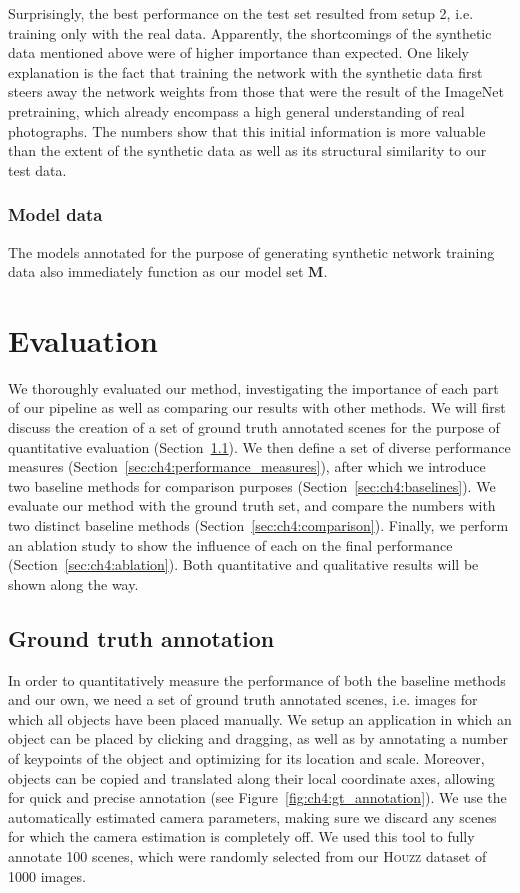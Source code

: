 \documentclass[10pt,twocolumn,letterpaper]{article}
\newcommand{\bb}[1]{{\bm{#1}}}
\begin{document}
Surprisingly, the best performance on the test set resulted from setup 2, i.e.
training only with the real data. Apparently, the shortcomings of the synthetic
data mentioned above were of higher importance than expected. One likely
explanation is the fact that training the network with the synthetic data first
steers away the network weights from those that were the result of the ImageNet
pretraining, which already encompass a high general understanding of real
photographs. The numbers show that this initial information is more valuable than the
extent of the synthetic data as well as its structural similarity to our test
data.

\subsubsection{Model data} The models annotated for the purpose of generating
synthetic network training data also immediately function as our model set
$\bb{M}$.

\section{Evaluation}
\label{sec:ch4:evaluation}
We thoroughly evaluated our method, investigating the importance of each part
of our pipeline as well as comparing our results with other methods.  We will
first discuss the creation of a set of ground truth annotated scenes for the
purpose of quantitative evaluation (Section~\ref{sec:ch4:ground_truth_annotation}). We then define
a set of diverse performance measures (Section~\ref{sec:ch4:performance_measures}), after which we introduce two baseline methods for comparison purposes (Section~\ref{sec:ch4:baselines}). We evaluate our method with the ground truth set,
and compare the numbers with two distinct baseline methods (Section~\ref{sec:ch4:comparison}). Finally, we perform
an ablation study to show the influence of each on the final performance (Section~\ref{sec:ch4:ablation}). Both
quantitative and qualitative results will be shown along the way.

\subsection{Ground truth annotation}
\label{sec:ch4:ground_truth_annotation}
In order to quantitatively measure the performance of both the baseline methods
and our own, we need a set of ground truth annotated scenes, i.e. images for
which all objects have been placed manually.  We setup an application in which
an object can be placed by clicking and dragging, as well as by annotating a
number of keypoints of the object and optimizing for its location and scale.
Moreover, objects can be copied and translated along their local coordinate
axes, allowing for quick and precise annotation (see
Figure~\ref{fig:ch4:gt_annotation}). We use the automatically estimated camera
parameters, making sure we discard any scenes for which the camera estimation
is completely off.  We used this tool to fully annotate 100 scenes, which were
randomly selected from our \textsc{Houzz} dataset of 1000 images.
\end{document}
